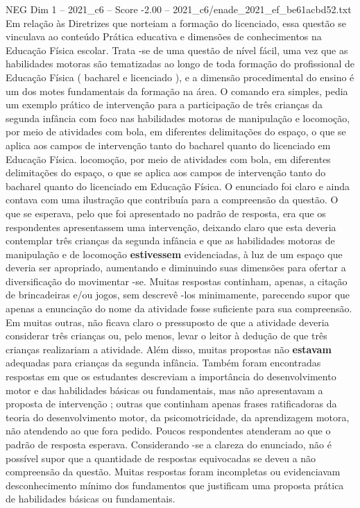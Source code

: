 \begin{textsample}{NEG Dim 1 – 2021\_c6 – Score -2.00 – 2021\_c6/enade\_2021\_ef\_be61acbd52.txt}
Em relação às Diretrizes que norteiam a formação do licenciado, essa questão se vinculava ao conteúdo Prática educativa e dimensões de conhecimentos na Educação Física escolar.
Trata -se de uma questão de nível fácil, uma vez que as habilidades motoras são tematizadas ao longo de toda formação do profissional de Educação Física ( bacharel e licenciado ), e a dimensão procedimental do ensino é um dos motes fundamentais da formação na área.
O comando era simples, pedia um exemplo prático de intervenção para a participação de três crianças da segunda infância com foco nas habilidades motoras de manipulação e locomoção, por meio de atividades com bola, em diferentes delimitações do espaço, o que se aplica aos campos de intervenção tanto do bacharel quanto do licenciado em Educação Física. locomoção, por meio de atividades com bola, em diferentes delimitações do espaço, o que se aplica aos campos de intervenção tanto do bacharel quanto do licenciado em Educação Física.
O enunciado foi claro e ainda contava com uma ilustração que contribuía para a compreensão da questão.
O que se esperava, pelo que foi apresentado no padrão de resposta, era que os respondentes apresentassem uma intervenção, deixando claro que esta deveria contemplar três crianças da segunda infância e que as habilidades motoras de manipulação e de locomoção \textbf{estivessem} evidenciadas, à luz de um espaço que deveria ser apropriado, aumentando e diminuindo suas dimensões para ofertar a diversificação do movimentar -se.
Muitas respostas continham, apenas, a citação de brincadeiras e/ou jogos, sem descrevê -los minimamente, parecendo supor que apenas a enunciação do nome da atividade fosse suficiente para sua compreensão.
Em muitas outras, não ficava claro o pressuposto de que a atividade deveria considerar três crianças ou, pelo menos, levar o leitor à dedução de que três crianças realizariam a atividade.
Além disso, muitas propostas não \textbf{estavam} adequadas para crianças da segunda infância.
Também foram encontradas respostas em que os estudantes descreviam a importância do desenvolvimento motor e das habilidades básicas ou fundamentais, mas não apresentavam a proposta de intervenção ; outras que continham apenas frases ratificadoras da teoria do desenvolvimento motor, da psicomotricidade, da aprendizagem motora, não atendendo ao que fora pedido.
Poucos respondentes atenderam ao que o padrão de resposta esperava.
Considerando -se a clareza do enunciado, não é possível supor que a quantidade de respostas equivocadas se deveu a não compreensão da questão.
Muitas respostas foram incompletas ou evidenciavam desconhecimento mínimo dos fundamentos que justificam uma proposta prática de habilidades básicas ou fundamentais.

\end{textsample}

